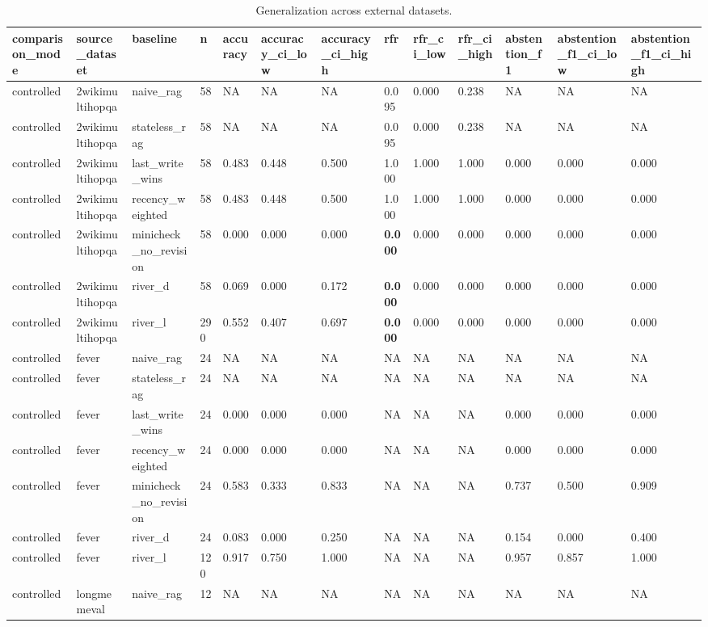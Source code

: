 \begin{table}
\centering
\caption{Generalization across external datasets.}
\begin{tabular}{lllllllllllll}
comparison\_mode & source\_dataset & baseline & n & accuracy & accuracy\_ci\_low & accuracy\_ci\_high & rfr & rfr\_ci\_low & rfr\_ci\_high & abstention\_f1 & abstention\_f1\_ci\_low & abstention\_f1\_ci\_high \\ \hline
controlled & 2wikimultihopqa & naive\_rag & 58 & NA & NA & NA & 0.095 & 0.000 & 0.238 & NA & NA & NA \\
controlled & 2wikimultihopqa & stateless\_rag & 58 & NA & NA & NA & 0.095 & 0.000 & 0.238 & NA & NA & NA \\
controlled & 2wikimultihopqa & last\_write\_wins & 58 & 0.483 & 0.448 & 0.500 & 1.000 & 1.000 & 1.000 & 0.000 & 0.000 & 0.000 \\
controlled & 2wikimultihopqa & recency\_weighted & 58 & 0.483 & 0.448 & 0.500 & 1.000 & 1.000 & 1.000 & 0.000 & 0.000 & 0.000 \\
controlled & 2wikimultihopqa & minicheck\_no\_revision & 58 & 0.000 & 0.000 & 0.000 & \textbf{0.000} & 0.000 & 0.000 & 0.000 & 0.000 & 0.000 \\
controlled & 2wikimultihopqa & river\_d & 58 & 0.069 & 0.000 & 0.172 & \textbf{0.000} & 0.000 & 0.000 & 0.000 & 0.000 & 0.000 \\
controlled & 2wikimultihopqa & river\_l & 290 & 0.552 & 0.407 & 0.697 & \textbf{0.000} & 0.000 & 0.000 & 0.000 & 0.000 & 0.000 \\
controlled & fever & naive\_rag & 24 & NA & NA & NA & NA & NA & NA & NA & NA & NA \\
controlled & fever & stateless\_rag & 24 & NA & NA & NA & NA & NA & NA & NA & NA & NA \\
controlled & fever & last\_write\_wins & 24 & 0.000 & 0.000 & 0.000 & NA & NA & NA & 0.000 & 0.000 & 0.000 \\
controlled & fever & recency\_weighted & 24 & 0.000 & 0.000 & 0.000 & NA & NA & NA & 0.000 & 0.000 & 0.000 \\
controlled & fever & minicheck\_no\_revision & 24 & 0.583 & 0.333 & 0.833 & NA & NA & NA & 0.737 & 0.500 & 0.909 \\
controlled & fever & river\_d & 24 & 0.083 & 0.000 & 0.250 & NA & NA & NA & 0.154 & 0.000 & 0.400 \\
controlled & fever & river\_l & 120 & 0.917 & 0.750 & 1.000 & NA & NA & NA & 0.957 & 0.857 & 1.000 \\
controlled & longmemeval & naive\_rag & 12 & NA & NA & NA & NA & NA & NA & NA & NA & NA \\

\end{tabular}
\end{table}
